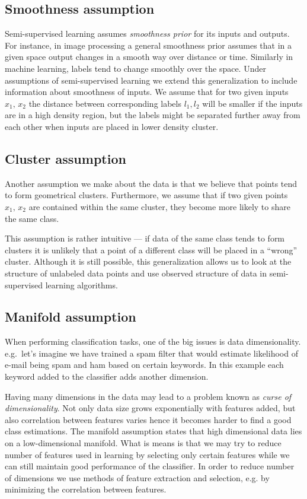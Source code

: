 \documentclass[12pt, a4paper, pdflatex]{report}
\begin{document}
\subsection{Smoothness assumption}

Semi-supervised learning assumes \emph{smoothness prior} for its inputs and outputs\cite{chapelle06}. For instance, in image processing a general smoothness prior assumes that in a given space output changes in a smooth way over distance or time\cite{stan95}. Similarly in machine learning, labels tend to change smoothly over the space. Under assumptions of semi-supervised learning we extend this generalization to include information about smoothness of inputs. We assume that for two given inputs $ x_1\text{, }x_2 $ the distance between corresponding labels $ l_1, l_2 $ will be smaller if the inputs are in a high density region, but the labels might be separated further away from each other when inputs are placed in lower density cluster.

\subsection{Cluster assumption}
\label{sec:clusterassump}

Another assumption we make about the data is that we believe that points tend to form geometrical clusters. Furthermore, we assume that if two given points $ x_1\text{, }x_2 $ are contained within the same cluster, they become more likely to share the same class\cite{chapelle06}.

This assumption is rather intuitive ---  if data of the same class tends to form clusters it is unlikely that a point of a different class will be placed in a ``wrong'' cluster. Although it is still possible, this generalization allows us to look at the structure of unlabeled data points and use observed structure of data in semi-supervised learning algorithms.

\subsection{Manifold assumption}
 
When performing classification tasks, one of the big issues is data dimensionality. e.g.\ let's imagine we have trained a spam filter that would estimate likelihood of e-mail being spam and ham based on certain keywords. In this example each keyword added to the classifier adds another dimension. 

Having many dimensions in the data may lead to a problem known as \textit{curse of dimensionality}\cite{chapelle06}. Not only data size grows exponentially with features added, but also correlation between features varies hence it becomes harder to find a good class estimations. The manifold assumption states that high dimensional data lies on a low-dimensional manifold. What is means is that we may try to reduce number of features used in learning by selecting only certain features while we can still maintain good performance of the classifier. In order to reduce number of dimensions we use methods of feature extraction and selection, e.g. by minimizing the correlation between features\cite{Hall99}.
\end{document}
